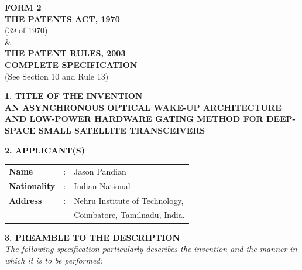 \documentclass[12pt,a4paper]{article}
\begin{document}
\begin{center}
    \textbf{\large FORM 2} \\
    \vspace{0.3cm}
    \textbf{THE PATENTS ACT, 1970} \\
    (39 of 1970) \\
    \& \\
    \textbf{THE PATENT RULES, 2003} \\
    \vspace{0.5cm}
    \textbf{\large COMPLETE SPECIFICATION} \\
    (See Section 10 and Rule 13) \\
    \vspace{1cm}
    
    \textbf{\Large 1. TITLE OF THE INVENTION} \\
    \vspace{0.5cm}
    \textbf{\large AN ASYNCHRONOUS OPTICAL WAKE-UP ARCHITECTURE AND LOW-POWER HARDWARE GATING METHOD FOR DEEP-SPACE SMALL SATELLITE TRANSCEIVERS} \\
    \vspace{1.5cm}
    
    \textbf{\Large 2. APPLICANT(S)} \\
    \vspace{0.5cm}
    \begin{tabular}{lll}
        \textbf{Name} & : & Jason Pandian \\
        \textbf{Nationality} & : & Indian National \\
        \textbf{Address} & : & Nehru Institute of Technology, \\
                         &   & Coimbatore, Tamilnadu, India. \\
    \end{tabular}
    \vspace{1.5cm}
    
    \textbf{\Large 3. PREAMBLE TO THE DESCRIPTION} \\
    \vspace{0.5cm}
    \textit{The following specification particularly describes the invention and the manner in which it is to be performed:}
\end{center}

\newpage
\end{document}
